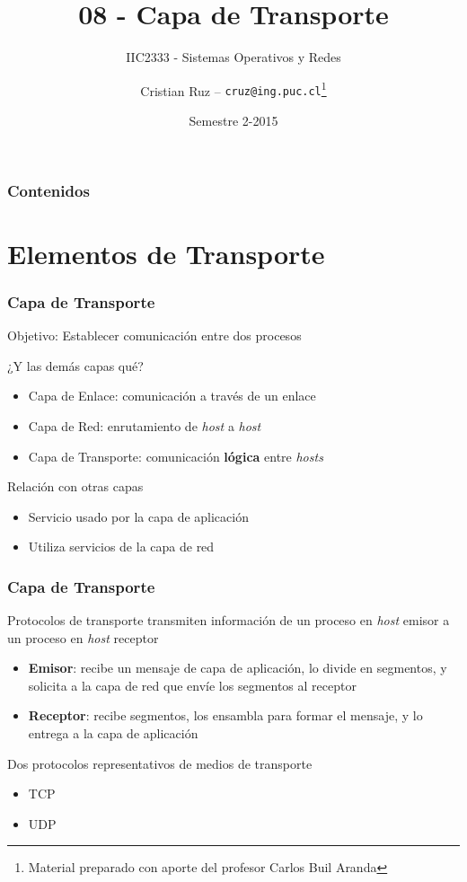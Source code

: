 \documentclass[letter]{beamer}
\title[IIC2333] %
{08 - Capa de Transporte}
\subtitle{IIC2333 - Sistemas Operativos y Redes}
\author[C.Ruz] %
{Cristian Ruz -- {\tt cruz@ing.puc.cl}\footnote{Material preparado con aporte del profesor Carlos Buil Aranda} }
\institute[PUC] %
{
  Departamento de Ciencia de la Computación\\
  Pontificia Universidad Católica de Chile
}
\date[2/2015] %
{Semestre 2-2015}
\begin{document}
\frame{\titlepage}


\begin{frame}
\frametitle{Contenidos}
\tableofcontents
\end{frame}


\section{Elementos de Transporte}

\begin{frame}
  \frametitle{Capa de Transporte}

  Objetivo: Establecer comunicación entre dos procesos
  
  ¿Y las demás capas qué?
  
  \begin{itemize}
    \item Capa de Enlace: comunicación a través de un enlace
    \item Capa de Red: enrutamiento de {\em host} a {\em host}
    \item Capa de Transporte: comunicación {\bf lógica} entre {\em hosts}
  \end{itemize}  

  Relación con otras capas  
  \begin{itemize}
    \item Servicio usado por la capa de aplicación
    \item Utiliza servicios de la capa de red
  \end{itemize}
\end{frame}

\begin{frame}
  \frametitle{Capa de Transporte}
  
  Protocolos de transporte transmiten información de un proceso en {\em host} emisor a un proceso en {\em host} receptor
  \begin{itemize}
    \item {\bf Emisor}: recibe un mensaje de capa de aplicación, lo divide en segmentos,
          y solicita a la capa de red que envíe los segmentos al receptor
    \item {\bf Receptor}: recibe segmentos, los ensambla para formar el mensaje, y lo entrega a la capa de aplicación
  \end{itemize}
  
  Dos protocolos representativos de medios de transporte
  \begin{itemize}
    \item TCP
    \item UDP
  \end{itemize}
\end{frame}
\end{document}
